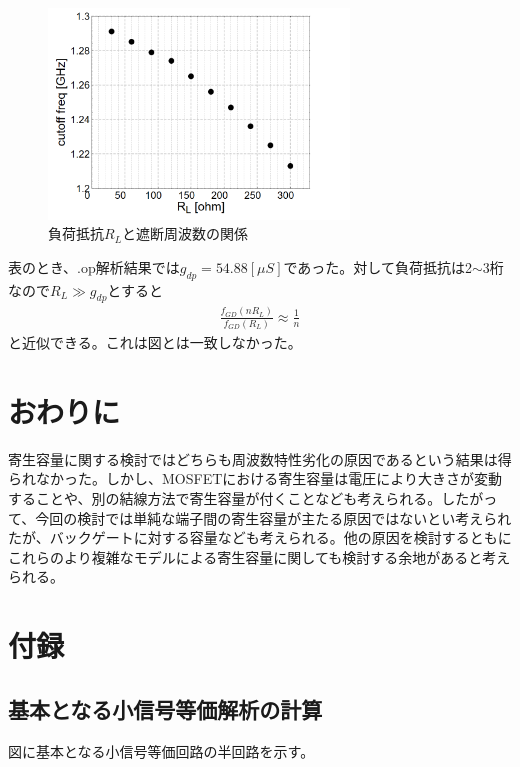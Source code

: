 \documentclass[twocolumn]{jsarticle}
\begin{document}
    \begin{figure}[h]
        \begin{center}
            \includegraphics*[width=80mm]{graphes/bitmap/RL_cutooff.PNG}
            \caption{負荷抵抗$R_{L}$と遮断周波数の関係}
            \label{fig:rl_cutoff}
        \end{center}        
    \end{figure}
    
    表のとき、.op解析結果では$g_{dp}=54.88[\mu S]$であった。対して負荷抵抗は2$\sim$3桁なので$R_{L}\gg g_{dp}$とすると
    \begin{align*}
        \frac{f_{GD}(nR_{L})}{f_{GD}(R_{L})}\approx \frac{1}{n}
    \end{align*}
    と近似できる。これは図とは一致しなかった。


\section{おわりに}
    寄生容量に関する検討ではどちらも周波数特性劣化の原因であるという結果は得られなかった。しかし、MOSFETにおける寄生容量は電圧により大きさが変動することや、別の結線方法で寄生容量が付くことなども考えられる。したがって、今回の検討では単純な端子間の寄生容量が主たる原因ではないとい考えられたが、バックゲートに対する容量なども考えられる。他の原因を検討するともにこれらのより複雑なモデルによる寄生容量に関しても検討する余地があると考えられる。


\section{付録}
\subsection{基本となる小信号等価解析の計算}
    図に基本となる小信号等価回路の半回路を示す。
\end{document}
